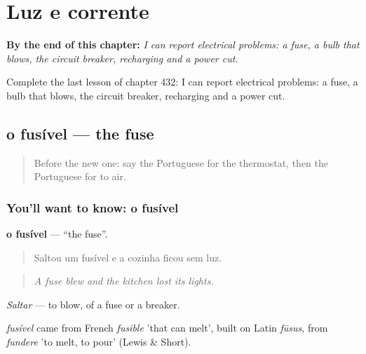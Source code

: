 
\chapter{Luz e corrente}
\label{ch:pt-luz-e-corrente}

\begin{chapteropening}
\textbf{By the end of this chapter:} \emph{I can report electrical problems: a fuse, a bulb that blows, the circuit breaker, recharging and a power cut.}

Complete the last lesson of chapter 432: I can report electrical problems: a fuse, a bulb that blows, the circuit breaker, recharging and a power cut.
\end{chapteropening}

\section[o fusível]{o fusível — the fuse}

\label{lesson:PT-C432-fusivel}



\begin{quote}
Before the new one: say the Portuguese for the thermostat, then the Portuguese for to air.
\end{quote}

\subsection*{You'll want to know: o fusível}
\textbf{o fusível} — \textquotedblleft{}the fuse\textquotedblright{}.

\begin{quote}
Saltou um fusível e a cozinha ficou sem luz.
\end{quote}

\begin{quote}
\emph{A fuse blew and the kitchen lost its lights.}
\end{quote}

\emph{Saltar} — to blow, of a fuse or a breaker.

\begin{cousinweb}
\emph{fusível} came from French \emph{fusible} 'that can melt', built on Latin \emph{fūsus}, from \emph{fundere} 'to melt, to pour' (Lewis \& Short).
\end{cousinweb}

